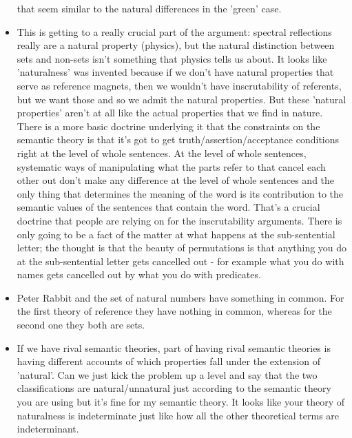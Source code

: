 \documentclass[12pt]{article}
\theoremstyle{definition}
\begin{document}
\begin{itemize}
        that seem similar to the natural differences in the 'green' case. 
    \item
        This is getting to a really crucial part of the argument: spectral
        reflections really are a natural property (physics), but the natural
        distinction between sets and non-sets isn't something that physics
        tells us about. It looks like 'naturalness' was invented because if we
        don't have natural properties that serve as reference magnets, then we
        wouldn't have inscrutability of referents, but we want those and so we
        admit the natural properties. But these 'natural properties' aren't at
        all like the actual properties that we find in nature. There is a more
        basic doctrine underlying it that the constraints on the semantic
        theory is that it's got to get truth/assertion/acceptance conditions
        right at the level of whole sentences. At the level of whole sentences,
        systematic ways of manipulating what the parts refer to that cancel
        each other out don't make any difference at the level of whole
        sentences and the only thing that determines the meaning of the word is
        its contribution to the semantic values of the sentences that contain
        the word. That's a crucial doctrine that people are relying on for the
        inscrutability arguments. There is only going to be a fact of the
        matter at what happens at the sub-sentential letter; the thought is
        that the beauty of permutations is that anything you do at the
        sub-sentential letter gets cancelled out - for example what you do with
        names gets cancelled out by what you do with predicates. 
    \item
        Peter Rabbit and the set of natural numbers have something in common.
        For the first theory of reference they have nothing in common, whereas
        for the second one they both are sets. 
    \item
        If we have rival semantic theories, part of having rival semantic
        theories is having different accounts of which properties fall under
        the extension of 'natural'. Can we just kick the problem up a level and
        say that the two classifications are natural/unnatural just according
        to the semantic theory you are using but it's fine for my semantic
        theory. It looks like your theory of naturalness is indeterminate just
        like how all the other theoretical terms are indeterminant.

\end{itemize}
\end{document}

